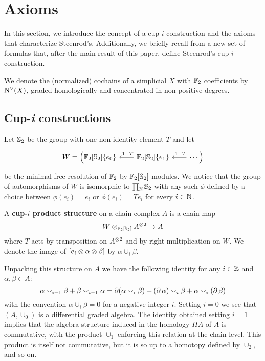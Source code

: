 
\section{Axioms}\label{s:statement}

In this section, we introduce the concept of a cup-$i$ construction and the axioms that characterize Steenrod's.
Additionally, we briefly recall from \cite{medina2023fast_sq} a new set of formulas that, after the main result of this paper, define Steenrod's cup-$i$ construction.

We denote the (normalized) cochains of a simplicial $X$ with ${\mathbb{F}_2}$ coefficients by $\operatorname{N^{\vee}}(X)$, graded homologically and concentrated in non-positive degrees.

\subsection{Cup-\textit{i} constructions}

Let $\mathbb{S}_2$ be the group with one non-identity element $T$ and let
\[
\begin{tikzcd}[column sep=20pt]
W = \Big(
\Ftwo[\sym_2]\{e_0\} &
\Ftwo[\sym_2]\{e_1\} \arrow[l, "\ 1+T"'] &
\arrow[l, "\ 1+T"'] \cdots \Big)
\end{tikzcd}
\]
be the minimal free resolution of ${\mathbb{F}_2}$ by ${\mathbb{F}_2}[\mathbb{S}_2]$-modules.
We notice that the group of automorphisms of $W$ is isomorphic to $\prod_{\mathbb{N}} \mathbb{S}_2$ with any such $\phi$ defined by a choice between $\phi(e_i) = e_i$ or $\phi(e_i) = Te_i$ for every $i \in \mathbb{N}$.

\begin{definition}
	A \textbf{\mbox{cup-$i$} product structure} on a chain complex $A$ is a chain map
	\[
	W \otimes_{{\mathbb{F}_2}[\mathbb{S}_2]} A^{\otimes 2} \to A
	\]
	where $T$ acts by transposition on $A^{\otimes 2}$ and by right multiplication on $W$.
	We denote the image of $[e_i \otimes \alpha \otimes \beta]$ by $\alpha \cup_i \beta$.
\end{definition}

Unpacking this structure on $A$ we have the following identity for any $i \in \mathbb{Z}$ and $\alpha, \beta \in A$:
\[
\alpha \smallsmile_{i-1} \beta + \beta \smallsmile_{i-1} \alpha =
\operatorname{\partial} (\alpha \smallsmile_{i} \beta) + (\operatorname{\partial}\alpha) \smallsmile_{i} \beta + \alpha \smallsmile_{i} (\operatorname{\partial}\beta)
\]
with the convention $\alpha \cup_{i} \beta = 0$ for a negative integer $i$.
Setting $i = 0$ we see that $(A, \cup_0)$ is a differential graded algebra.
The identity obtained setting $i = 1$ implies that the algebra structure induced in the homology $HA$ of $A$ is commutative, with the product $\cup_1$ enforcing this relation at the chain level.
This product is itself not commutative, but it is so up to a homotopy defined by $\cup_2$, and so on.


